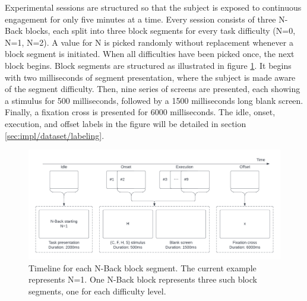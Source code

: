 Experimental sessions are structured so that the subject is exposed to continuous engagement for only five minutes at a time. Every session consists of three N-Back blocks, each split into three block segments for every task difficulty (N=0, N=1, N=2). A value for N is picked randomly without replacement whenever a block segment is initiated. When all difficulties have been picked once, the next block begins. Block segments are structured as illustrated in figure \ref{fig:impl/NBackBlockSeg}. It begins with two milliseconds of segment presentation, where the subject is made aware of the segment difficulty. Then, nine series of screens are presented, each showing a stimulus for 500 milliseconds, followed by a 1500 milliseconds long blank screen. Finally, a fixation cross is presented for 6000 milliseconds. The idle, onset, execution, and offset labels in the figure will be detailed in section \ref{sec:impl/dataset/labeling}.


\begin{figure}[h]
    \centering
    \includegraphics[width=\textwidth]{figures/impl_NBackBlock.png}
    \caption{Timeline for each N-Back block segment. The current example represents N=1. One N-Back block represents three such block segments, one for each difficulty level.}
    \label{fig:impl/NBackBlockSeg}
\end{figure}


